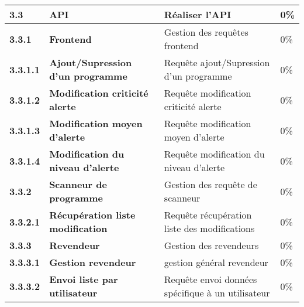 \begin{supertabular}{|p{2.2cm} p{6cm}|p{5cm}|R{2cm}|}
  \textbf{3.3}  & \textbf{API} & \textbf{Réaliser l'API} & \textbf{0\%} \\
  \hline

  \hspace{6pt}
  \textbf{3.3.1}  & \textbf{Frontend} & Gestion des requêtes frontend & 0\% \\
  \hline

  \hspace{12pt}
  \textbf{3.3.1.1}  & \textbf{Ajout/Supression d'un programme} & Requête ajout/Supression d'un programme  & 0\% \\
  \hline

  \hspace{12pt}
  \textbf{3.3.1.2}  & \textbf{Modification criticité alerte} & Requête modification criticité alerte & 0\% \\
  \hline

  \hspace{12pt}
  \textbf{3.3.1.3}  & \textbf{Modification moyen d'alerte} & Requête modification moyen d'alerte  & 0\% \\
  \hline

  \hspace{12pt}
  \textbf{3.3.1.4}  & \textbf{Modification du niveau d'alerte} & Requête modification du niveau d'alerte  & 0\% \\
  \hline


  \hspace{6pt}
  \textbf{3.3.2}  & \textbf{Scanneur de programme} & Gestion des requête de scanneur & 0\% \\
  \hline

  \hspace{12pt}
  \textbf{3.3.2.1}  & \textbf{Récupération liste modification} & Requête récupération liste des modifications  & 0\% \\
  \hline


  \hspace{6pt}
  \textbf{3.3.3}  & \textbf{Revendeur} & Gestion des revendeurs & 0\% \\
  \hline

  \hspace{12pt}
  \textbf{3.3.3.1}  & \textbf{Gestion revendeur} & gestion général revendeur  & 0\% \\
  \hline

  \hspace{12pt}
  \textbf{3.3.3.2}  & \textbf{Envoi liste par utilisateur} & Requête envoi données spécifique à un utilisateur  & 0\% \\
  \hline




\end{supertabular}
